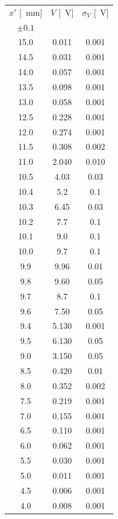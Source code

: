 \documentclass[10pt,oneside,a4paper]{article}
\begin{document}
\begin{minipage}[t]{0.33\linewidth}
\vspace{0cm}
\begin{center}
\label{tab:babinet}
\begin{tabular}{c|c|c}
$x'$ [\SI{}{mm}] & $V$ [\SI{}{V}] & $\sigma_V$ [\SI{}{V}]\\
$\pm 0.1$ & & \\
\hline
 15.0 & 0.011 & 0.001 \\
 14.5 & 0.031 & 0.001 \\
 14.0 & 0.057 & 0.001 \\
 13.5 & 0.098 & 0.001 \\
 13.0 & 0.058 & 0.001 \\
 12.5 & 0.228 & 0.001 \\
 12.0 & 0.274 & 0.001 \\
 11.5 & 0.308 & 0.002 \\
 11.0 & 2.040 & 0.010 \\
 10.5 & 4.03 & 0.03 \\
  10.4 & 5.2 & 0.1 \\
 10.3 & 6.45 & 0.03 \\
 10.2 & 7.7 & 0.1 \\
  10.1 & 9.0 & 0.1 \\
 10.0 & 9.7 & 0.1 \\
   9.9 & 9.96 & 0.01 \\
  9.8 & 9.60 & 0.05 \\
  9.7 & 8.7 & 0.1 \\
  9.6 & 7.50 & 0.05 \\
  9.4 & 5.130 & 0.001 \\
  9.5 & 6.130& 0.05 \\
  9.0 & 3.150& 0.05 \\
  8.5 & 0.420& 0.01 \\
  8.0 & 0.352 & 0.002 \\
  7.5 & 0.219 & 0.001 \\
  7.0 & 0.155 & 0.001 \\
  6.5 & 0.110 & 0.001 \\
  6.0 & 0.062 & 0.001 \\
  5.5 & 0.030 & 0.001 \\
  5.0 & 0.011 & 0.001 \\
  4.5 & 0.006 & 0.001 \\
  4.0 & 0.008 & 0.001 \\
\hline
\end{tabular}
\end{center}
\end{minipage}
\end{document}

